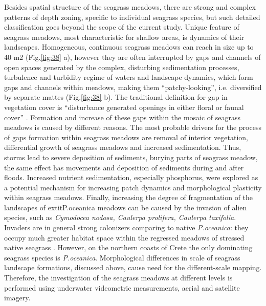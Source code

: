 \documentclass[11pt]{article}
\begin{document}
Besides spatial structure of the seagrass meadows, there are strong and complex patterns of depth zoning, specific to individual
seagrass species, but such detailed classification goes beyond the scope of the current study.
Unique feature of seagrass meadows, most characteristic for shallow areas, is dynamics of their
landscapes. Homogeneous, continuous seagrass meadows can reach in size up to 40 m2 (Fig.\ref{fig:38} a),
however they are often interrupted by gaps and channels of open spaces generated by the complex,
disturbing sedimentation processes, turbulence and turbidity regime of waters and landscape dynamics,
which form gaps and channels within meadows, making them “patchy-looking”, i.e. diversified by
separate mattes (Fig.\ref{fig:38} b). The traditional definition for gap in vegetation cover is “disturbance generated
openings in either floral or faunal cover” \cite{Connell78}\label{Connell78}.
Formation and increase of these
gaps within the mosaic of seagrass meadows is caused by different reasons. The most probable
drivers for the process of gaps formation within seagrass meadows are removal of interior vegetation,
differential growth of seagrass meadows and increased sedimentation. Thus, storms lead to severe
deposition of sediments, burying parts of seagrass meadow, the same effect has movements and
deposition of sediments during and after floods\cite{Bell99}\label{Bell99}.
Increased nutrient sedimentation, especially phosphorus, were explored \cite{Jensen01}\label{Jensen01} as a
potential mechanism for increasing patch dynamics and morphological plasticity within seagrass
meadows. Finally, increasing the degree of fragmentation of the landscapes of 	extit{P.oceanica} meadows
can be caused by the invasion of alien species, such as \textit{Cymodocea nodosa, Caulerpa prolifera,
Caulerpa taxifolia}. Invaders are in general strong colonizers comparing to native \textit{P.oceanica}: they
occupy much greater habitat space within the regressed meadows of stressed native seagrass
\cite{Montefalcone10}\label{Montefalcone10}. However, on the northern coasts of Crete the only dominating seagrass
species is \textit{P.oceanica}.
Morphological differences in scale of seagrass landscape formations, discussed above, cause need for
the different-scale mapping. Therefore, the investigation of the seagrass meadows at different levels is
performed using underwater videometric measurements, aerial and satellite imagery.
\end{document}
